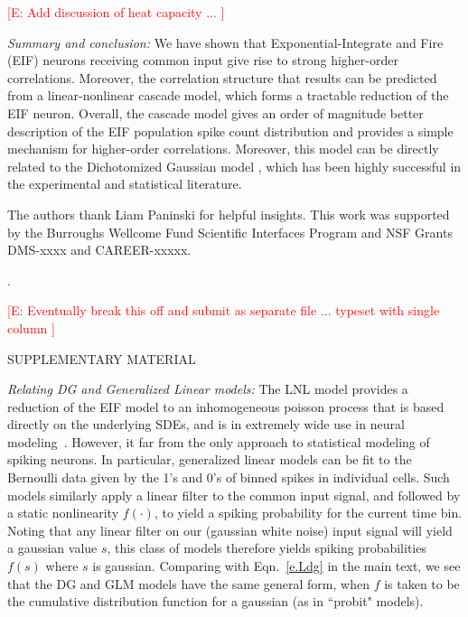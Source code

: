 \documentclass[%
 reprint,
 twocolumn,
 amsmath,amssymb,
 aps,
floatfix,
]{revtex4}
\newcommand{\Ecomment}[1]{\textcolor{red}{[E: #1]}}
\begin{document}
\bigskip

\Ecomment{Add discussion of heat capacity ... }

\bigskip 
{\it Summary and conclusion:}   %
We have shown that Exponential-Integrate and Fire (EIF) neurons receiving common input give rise to strong higher-order correlations.  Moreover, the correlation structure that results can be predicted from a linear-nonlinear cascade model, which forms  a tractable reduction of the EIF neuron.  Overall, the cascade model gives an order of magnitude better description of the EIF population spike count distribution and provides a simple mechanism for higher-order correlations.  Moreover, this model can be directly related to the Dichotomized Gaussian model , which has been highly successful in the experimental and statistical literature.

\bigskip 

\bigskip



The authors thank Liam Paninski for helpful insights. This work was supported by the Burroughs Wellcome Fund Scientific Interfaces Program and NSF Grants DMS-xxxx and CAREER-xxxxx.  



\newpage
.
\newpage

\Ecomment{Eventually break this off and submit as separate file ... typeset with single column }


\bigskip

SUPPLEMENTARY MATERIAL 

\bigskip


{\it Relating DG and Generalized Linear models:}
The LNL model provides a reduction of the EIF model to an inhomogeneous poisson process that is based directly on the underlying SDEs, and is in extremely wide use in neural modeling~\cite{Abb-Dayan}.  However, it far from the only approach to statistical modeling of spiking neurons.  In particular, generalized linear models can be fit to the Bernoulli data given by the 1's and 0's of binned spikes in individual cells.  Such models similarly apply a linear filter to the common input signal, and followed by a static nonlinearity $f(\cdot)$, to yield a spiking probability for the current time bin.  Noting that any linear filter on our (gaussian white noise) input signal will yield a gaussian value $s$, this class of models therefore yields spiking probabilities $f(s)$ where $s$ is gaussian.  Comparing with Eqn.~\eqref{e.Ldg} in the main text, we see that the DG and GLM models have the same general form, when $f$ is taken to be the cumulative distribution function for a gaussian (as in ``probit" models). 
\end{document}
